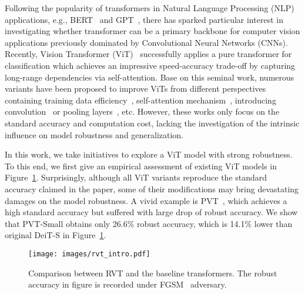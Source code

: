 \documentclass[10pt,twocolumn,letterpaper]{article}
\begin{document}
Following the popularity of transformers in Natural Language Processing (NLP) applications, e.g., BERT~\cite{DBLP:conf/naacl/DevlinCLT19} and GPT~\cite{radford2018improving}, there has sparked particular interest in investigating whether transformer can be a primary backbone for computer vision applications previously dominated by Convolutional Neural Networks (CNNs). Recently, Vision Transformer (ViT)~\cite{dosovitskiy2020image} successfully applies a pure transformer for classification which achieves an impressive speed-accuracy trade-off by capturing long-range dependencies via self-attention. Base on this seminal work, numerous variants have been proposed to improve ViTs from different perspectives containing training data efficiency~\cite{touvron2020training}, self-attention mechanism~\cite{liu2021swin}, introducing convolution~\cite{li2021localvit, wu2021cvt,yuan2021incorporating} or pooling layers~\cite{wang2021pyramid,heo2021rethinking}, etc. However, these works only focus on the standard accuracy and computation cost, lacking the investigation of the intrinsic influence on model robustness and generalization.

In this work, we take initiatives to explore a ViT model with strong robustness. To this end, we first give an empirical assessment of existing ViT models in Figure~\ref{fig:teaser1}. Surprisingly, although all ViT variants reproduce the standard accuracy claimed in the paper, some of their modifications may bring devastating damages on the model robustness. A vivid example is PVT~\cite{wang2021pyramid}, which achieves a high standard accuracy but suffered with large drop of robust accuracy. 
We show that PVT-Small obtains only 26.6\% robust accuracy, which is 14.1\% lower than original DeiT-S in Figure~\ref{fig:teaser1}.

\begin{figure}
\vspace{-5pt}
    \centering
    \texttt{[image: images/rvt\_intro.pdf]}
    \caption{Comparison between RVT and the baseline transformers. The robust accuracy in figure is recorded under FGSM~\cite{goodfellow2014explaining} adversary.}
    \label{fig:teaser1}
    \vspace{-1em}
\end{figure}
\end{document}
